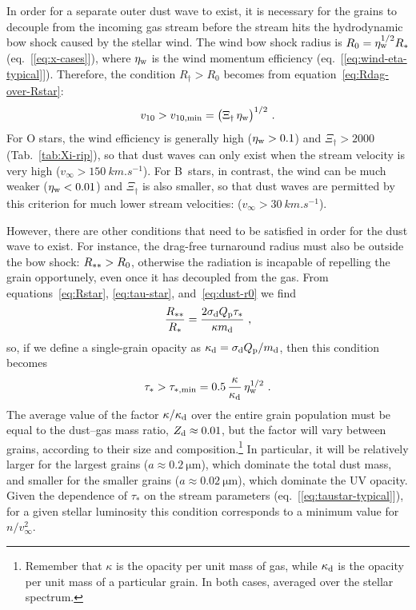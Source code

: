 In order for a separate outer dust wave to exist, it is necessary for
the grains to decouple from the incoming gas stream before the stream
hits the hydrodynamic bow shock caused by the stellar wind.  The wind
bow shock radius is \(R_0 = \eta_{\text{w}}^{1/2} R_*\) (eq.~[\ref{eq:x-cases}]),
where \(\eta_{\text{w}}\) is the wind momentum efficiency
(eq.~[\ref{eq:wind-eta-typical}]).  Therefore, the condition
\(R_\dag > R_0\) becomes from equation~\eqref{eq:Rdag-over-Rstar}:
\begin{equation}
  \label{eq:dust-wave-velocity-condition}
  v_{10} > v_{10,\text{min}} = \bigl( \Xi_\dag \, \eta_{\text{w}} \bigr)^{1/2} \ . 
\end{equation}
For O stars, the wind efficiency is generally high (\(\eta_{\text{w}} > 0.1\)) and
\(\Xi_\dag > 2000\) (Tab.~\ref{tab:Xi-rip}), so that dust waves can only
exist when the stream velocity is very high
(\(v_\infty > \SI{150}{km.s^{-1}}\)).  For B~stars, in contrast, the wind
can be much weaker (\(\eta_{\text{w}} < 0.01\)) and \(\Xi_\dag\) is also smaller, so
that dust waves are permitted by this criterion for much lower stream
velocities: (\(v_\infty > \SI{30}{km.s^{-1}}\)).

However, there are other conditions that need to be satisfied in order
for the dust wave to exist.  For instance, the drag-free turnaround
radius must also be outside the bow shock: \(R_{**} > R_0\),
otherwise the radiation is incapable of repelling the grain
opportunely, even once it has decoupled from the gas.  From
equations~\eqref{eq:Rstar}, \eqref{eq:tau-star},
and~\eqref{eq:dust-r0} we find
\begin{equation}
  \label{eq:Rstarstar-over-Rstar}
  \frac{R_{**}}{R_*} = \frac{2 \sigma_{\text{d}} Q_{\text{p}} \tau_*}{\kappa m_{\text{d}}} \ , 
\end{equation}
so, if we define a single-grain opacity as
\(\kappa_{\text{d}} = \sigma_{\text{d}} Q_{\text{p}} / m_{\text{d}}\), then this condition becomes
\begin{equation}
  \label{eq:dust-wave-low-density-condition}
  \tau_* >  \tau_{*,\text{min}} = 0.5\, \frac{\kappa}{\kappa_{\text{d}}}\, \eta_{\text{w}}^{1/2} 
  \ . 
\end{equation}
The average value of the factor \(\kappa / \kappa_{\text{d}}\) over the entire grain
population must be equal to the dust--gas mass ratio,
\(Z_{\text{d}} \approx 0.01\), but the factor will vary between grains, according
to their size and composition.\footnote{%
  Remember that \(\kappa\) is the opacity per unit mass of gas, while
  \(\kappa_{\text{d}}\) is the opacity per unit mass of a particular grain. In
  both cases, averaged over the stellar spectrum.} %
In particular, it will be relatively larger for the largest grains
(\(a \approx \SI{0.2}{\um}\)), which dominate the total dust mass, and
smaller for the smaller grains (\(a \approx \SI{0.02}{\um}\)), which
dominate the UV opacity.  Given the dependence of \(\tau_*\) on the
stream parameters (eq.~[\ref{eq:taustar-typical}]), for a given
stellar luminosity this condition corresponds to a minimum value for
\(n / v_\infty^2\).


